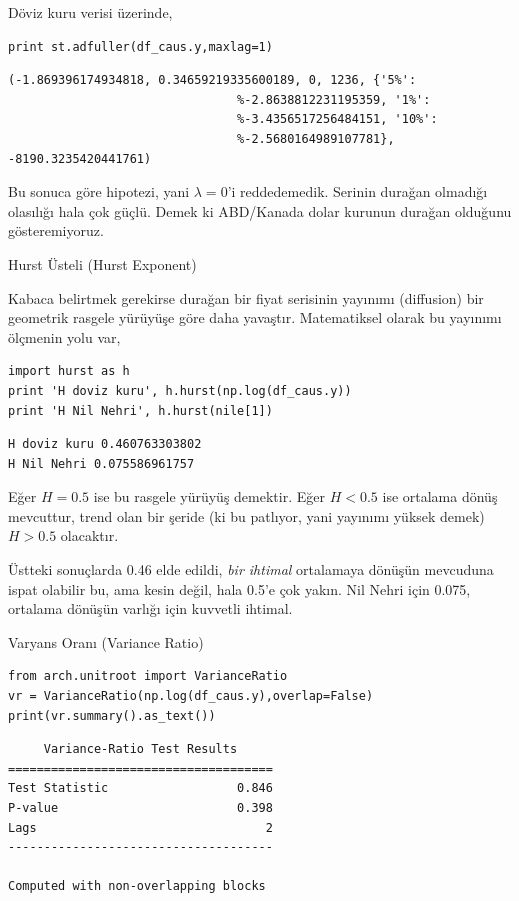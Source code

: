 \documentclass[12pt,fleqn]{article}\usepackage{../../common}
\begin{document}
Döviz kuru verisi üzerinde, 

\begin{verbatim}
print st.adfuller(df_caus.y,maxlag=1)
\end{verbatim}

\begin{verbatim}
(-1.869396174934818, 0.34659219335600189, 0, 1236, {'5%':
                                %-2.8638812231195359, '1%':
                                %-3.4356517256484151, '10%':
                                %-2.5680164989107781}, -8190.3235420441761) 
\end{verbatim}

Bu sonuca göre hipotezi, yani $\lambda=0$'i reddedemedik. Serinin durağan
olmadığı olasılığı hala çok güçlü. Demek ki ABD/Kanada dolar kurunun durağan
olduğunu gösteremiyoruz.

Hurst Üsteli (Hurst Exponent)

Kabaca belirtmek gerekirse durağan bir fiyat serisinin yayınımı (diffusion)
bir geometrik rasgele yürüyüşe göre daha yavaştır. Matematiksel olarak bu
yayınımı ölçmenin yolu var, 

\begin{verbatim}
import hurst as h
print 'H doviz kuru', h.hurst(np.log(df_caus.y))
print 'H Nil Nehri', h.hurst(nile[1])
\end{verbatim}

\begin{verbatim}
H doviz kuru 0.460763303802
H Nil Nehri 0.075586961757
\end{verbatim}

Eğer $H=0.5$ ise bu rasgele yürüyüş demektir. Eğer $H<0.5$ ise ortalama dönüş
mevcuttur, trend olan bir şeride (ki bu patlıyor, yani yayınımı yüksek demek)
$H>0.5$ olacaktır.

Üstteki sonuçlarda 0.46 elde edildi, {\em bir ihtimal} ortalamaya dönüşün
mevcuduna ispat olabilir bu, ama kesin değil, hala 0.5'e çok yakın. Nil Nehri
için 0.075, ortalama dönüşün varlığı için kuvvetli ihtimal.

Varyans Oranı (Variance Ratio)

\begin{verbatim}
from arch.unitroot import VarianceRatio
vr = VarianceRatio(np.log(df_caus.y),overlap=False)
print(vr.summary().as_text())
\end{verbatim}

\begin{verbatim}
     Variance-Ratio Test Results     
=====================================
Test Statistic                  0.846
P-value                         0.398
Lags                                2
-------------------------------------

Computed with non-overlapping blocks
\end{verbatim}
\end{document}
